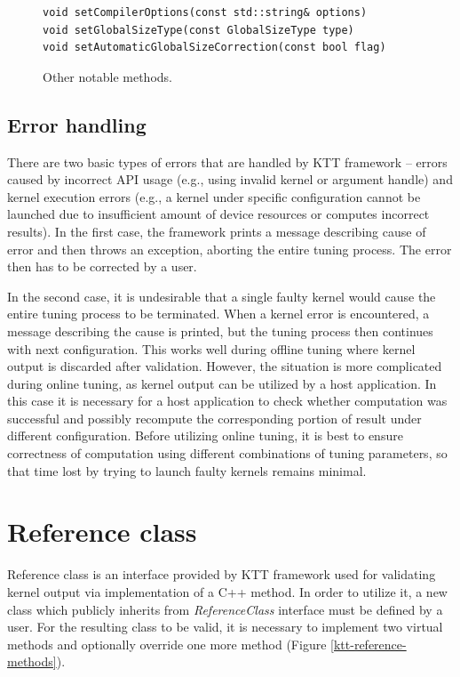 \documentclass
[
    digital, %
    oneside, %
    table, %
    nolof, %
    nolot, %
    nocover %
]{fithesis3}
\begin{document}
\begin{figure}
\begin{adjustwidth}{-1cm}{-1cm}
\begin{lstlisting}
void setCompilerOptions(const std::string& options)
void setGlobalSizeType(const GlobalSizeType type)
void setAutomaticGlobalSizeCorrection(const bool flag)
\end{lstlisting}
\caption{Other notable methods.}
\label{ktt-utility-methods}
\end{adjustwidth}
\end{figure}

\subsection{Error handling}
There are two basic types of errors that are handled by KTT framework -- errors caused by incorrect API usage (e.g., using invalid kernel or argument
handle) and kernel execution errors (e.g., a kernel under specific configuration cannot be launched due to insufficient amount of device resources or
computes incorrect results). In the first case, the framework prints a message describing cause of error and then throws an exception, aborting the entire
tuning process. The error then has to be corrected by a user.

In the second case, it is undesirable that a single faulty kernel would cause the entire tuning process to be terminated. When a kernel error is
encountered, a message describing the cause is printed, but the tuning process then continues with next configuration. This works well during offline
tuning where kernel output is discarded after validation. However, the situation is more complicated during online tuning, as kernel output can be utilized
by a host application. In this case it is necessary for a host application to check whether computation was successful and possibly recompute the
corresponding portion of result under different configuration. Before utilizing online tuning, it is best to ensure correctness of computation using
different combinations of tuning parameters, so that time lost by trying to launch faulty kernels remains minimal.

\section{Reference class}
\label{ktt-reference-class}
Reference class is an interface provided by KTT framework used for validating kernel output via implementation of a C++ method. In order to utilize it,
a new class which publicly inherits from \textit{ReferenceClass} interface must be defined by a user. For the resulting class to be valid, it is
necessary to implement two virtual methods and optionally override one more method (Figure \ref{ktt-reference-methods}).
\end{document}
